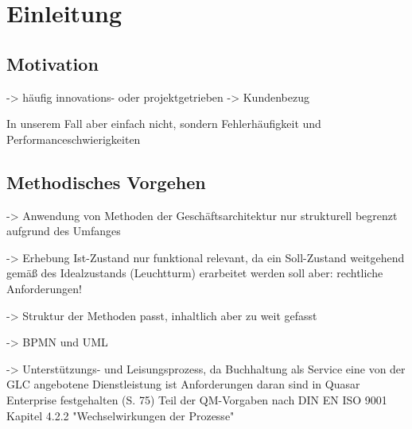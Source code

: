 \chapter{Einleitung}

\section{Motivation}

-> häufig innovations- oder projektgetrieben
-> Kundenbezug

In unserem Fall aber einfach nicht, sondern Fehlerhäufigkeit und Performanceschwierigkeiten

\section{Methodisches Vorgehen}


-> Anwendung von Methoden der Geschäftsarchitektur nur strukturell begrenzt aufgrund des Umfanges

-> Erhebung Ist-Zustand nur funktional relevant, da ein Soll-Zustand weitgehend gemäß des Idealzustands (Leuchtturm) erarbeitet werden soll
aber: rechtliche Anforderungen!

-> Struktur der Methoden passt, inhaltlich aber zu weit gefasst

-> BPMN und UML

-> Unterstützungs- und Leisungsprozess, da Buchhaltung als Service eine von der GLC angebotene Dienstleistung ist
Anforderungen daran sind in Quasar Enterprise festgehalten (S. 75)
Teil der QM-Vorgaben nach DIN EN ISO 9001 Kapitel 4.2.2 "Wechselwirkungen der Prozesse" 